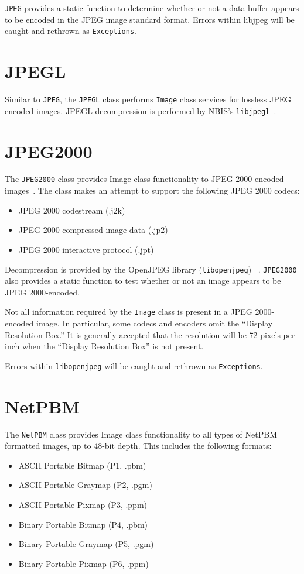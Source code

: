 \texttt{JPEG} provides a static function to determine whether or not a
data buffer appears to be encoded in the JPEG image standard format.  Errors
within libjpeg will be caught and rethrown as \texttt{Exceptions}.

\section{JPEGL}
\label{sec-image-jpeg}
Similar to \texttt{JPEG}, the \texttt{JPEGL} class performs \texttt{Image} class
services for lossless JPEG encoded images.  JPEGL decompression is performed
by NBIS's \texttt{libjpegl}~\cite{nbis}.

\section{JPEG2000}
\label{sec-image-jpeg2000}
The \texttt{JPEG2000} class provides Image class functionality to JPEG 
2000-encoded images~\cite{jpeg2000}.  The class makes an attempt to support the 
following JPEG 2000 codecs:
\begin{itemize}
\item JPEG 2000 codestream (.j2k)
\item JPEG 2000 compressed image data (.jp2)
\item JPEG 2000 interactive protocol (.jpt)
\end{itemize}
Decompression is provided by the OpenJPEG library (\texttt{libopenjpeg})
~\cite{libopenjpeg}.  \texttt{JPEG2000} also provides a static function to test
whether or not an image appears to be JPEG 2000-encoded.

Not all information required by the \texttt{Image} class is present in a JPEG 
2000-encoded image.  In particular, some codecs and encoders omit the ``Display
Resolution Box.''  It is generally accepted that the resolution will be 72
pixels-per-inch when the ``Display Resolution Box'' is not present.

Errors within \texttt{libopenjpeg} will be caught and rethrown as 
\texttt{Exceptions}.

\section{NetPBM}
\label{sec-image-netpbm}
The \texttt{NetPBM} class provides Image class functionality to all types of 
NetPBM formatted images, up to 48-bit depth.  This includes the following 
formats:

\begin{itemize}
\item ASCII Portable Bitmap (P1, .pbm)
\item ASCII Portable Graymap (P2, .pgm)
\item ASCII Portable Pixmap (P3, .ppm)
\item Binary Portable Bitmap (P4, .pbm)
\item Binary Portable Graymap (P5, .pgm)
\item Binary Portable Pixmap (P6, .ppm)
\end{itemize}

